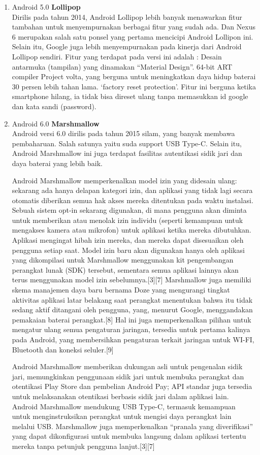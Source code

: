 \begin{enumerate}
\item Android 5.0 \textbf{Lollipop}\\
Dirilis pada tahun 2014, Android Lollipop lebih banyak menawarkan fitur tambahan untuk menyempurnakan berbagai fitur yang sudah ada. Dan Nexus 6 merupakan salah satu ponsel yang pertama mencicipi Android Lollipon ini. Selain itu, Google juga lebih menyempurnakan pada kinerja dari Android Lollipop sendiri. Fitur yang terdapat pada versi ini adalah : 
Desain antarmuka (tampilan) yang dinamakan “Material Design”.
64-bit ART compiler
Project volta, yang berguna untuk meningkatkan daya hidup baterai 30 persen lebih tahan lama.
‘factory reset protection’. Fitur ini berguna ketika smartphone hilang, ia tidak bisa direset ulang tanpa memasukkan id google dan kata sandi (password).

\item Android 6.0 \textbf{Marshmallow}\\
Android versi 6.0 dirilis pada tahun 2015 silam, yang banyak membawa pembaharuan. Salah satunya yaitu suda support USB Type-C. Selain itu, Android Marshmallow ini juga terdapat fasilitas autentikasi sidik jari dan daya baterai yang lebih baik. 

Android Marshmallow memperkenalkan model izin yang didesain ulang: sekarang ada hanya delapan kategori izin, dan aplikasi yang tidak lagi secara otomatis diberikan semua hak akses mereka ditentukan pada waktu instalasi. Sebuah sistem opt-in sekarang digunakan, di mana pengguna akan diminta untuk memberikan atau menolak izin individu (seperti kemampuan untuk mengakses kamera atau mikrofon) untuk aplikasi ketika mereka dibutuhkan. Aplikasi mengingat hibah izin mereka, dan mereka dapat disesuaikan oleh pengguna setiap saat. Model izin baru akan digunakan hanya oleh aplikasi yang dikompilasi untuk Marshmallow menggunakan kit pengembangan perangkat lunak (SDK) tersebut, sementara semua aplikasi lainnya akan terus menggunakan model izin sebelumnya.[3][7]
Marshmallow juga memiliki skema manajemen daya baru bernama Doze yang mengurangi tingkat aktivitas aplikasi latar belakang saat perangkat menentukan bahwa itu tidak sedang aktif ditangani oleh pengguna, yang, menurut Google, menggandakan pemakaian baterai perangkat.[8] Hal ini juga memperkenalkan pilihan untuk mengatur ulang semua pengaturan jaringan, tersedia untuk pertama kalinya pada Android, yang membersihkan pengaturan terkait jaringan untuk WI-FI, Bluetooth dan koneksi seluler.[9]

Android Marshmallow memberikan dukungan asli untuk pengenalan sidik jari, memungkinkan penggunaan sidik jari untuk membuka perangkat dan otentikasi Play Store dan pembelian Android Pay; API standar juga tersedia untuk melaksanakan otentikasi berbasis sidik jari dalam aplikasi lain. Android Marshmallow mendukung USB Type-C, termasuk kemampuan untuk menginstruksikan perangkat untuk mengisi daya perangkat lain melalui USB. Marshmallow juga memperkenalkan “pranala yang diverifikasi” yang dapat dikonfigurasi untuk membuka langsung dalam aplikasi tertentu mereka tanpa petunjuk pengguna lanjut.[3][7]


\end{enumerate}
